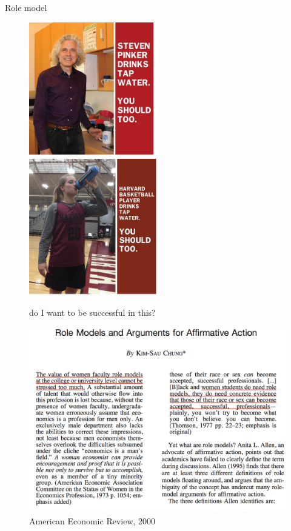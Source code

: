 \begin{frame}{Role model}

\begin{figure}
\centering
\includegraphics[width=0.5\textwidth]{tap_water_pinker.jpg}
\includegraphics[width=0.5\textwidth]{tap_water_basket.jpg}
\caption{do I want to be successful in this?}
\end{figure}

\end{frame}

\begin{frame}

\begin{figure}
\centering
\includegraphics{aer-citation.png}
\caption{American Economic Review, 2000}
\end{figure}

\end{frame}

